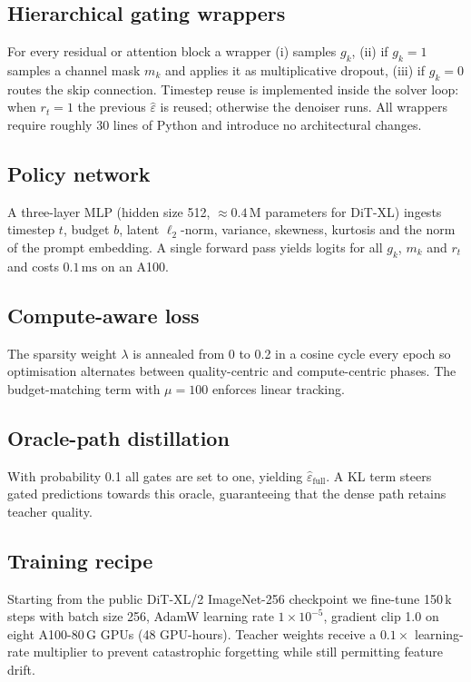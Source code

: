 \documentclass{article} %
\begin{document}
\subsection{Hierarchical gating wrappers}
For every residual or attention block a wrapper (i) samples \(g_{k}\), (ii) if \(g_{k}=1\) samples a channel mask \(m_{k}\) and applies it as multiplicative dropout, (iii) if \(g_{k}=0\) routes the skip connection. Timestep reuse is implemented inside the solver loop: when \(r_{t}=1\) the previous \(\hat{\varepsilon}\) is reused; otherwise the denoiser runs. All wrappers require roughly 30 lines of Python and introduce no architectural changes.

\subsection{Policy network}
A three-layer MLP (hidden size 512, \(\approx0.4\,\mathrm{M}\) parameters for DiT-XL) ingests timestep \(t\), budget \(b\), latent \(\ell_{2}\)-norm, variance, skewness, kurtosis and the norm of the prompt embedding. A single forward pass yields logits for all \(g_{k}\), \(m_{k}\) and \(r_{t}\) and costs \(0.1\,\mathrm{ms}\) on an A100.

\subsection{Compute-aware loss}
The sparsity weight \(\lambda\) is annealed from 0 to 0.2 in a cosine cycle every epoch so optimisation alternates between quality-centric and compute-centric phases. The budget-matching term with \(\mu=100\) enforces linear tracking.

\subsection{Oracle-path distillation}
With probability 0.1 all gates are set to one, yielding \(\hat{\varepsilon}_{\text{full}}\). A KL term steers gated predictions towards this oracle, guaranteeing that the dense path retains teacher quality.

\subsection{Training recipe}
Starting from the public DiT-XL/2 ImageNet-256 checkpoint we fine-tune 150\,k steps with batch size 256, AdamW learning rate \(1\times10^{-5}\), gradient clip 1.0 on eight A100-80\,G GPUs (48 GPU-hours). Teacher weights receive a \(0.1\times\) learning-rate multiplier to prevent catastrophic forgetting while still permitting feature drift.
\end{document}
